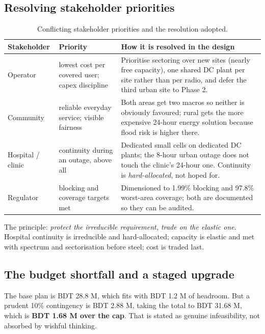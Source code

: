 \documentclass[9pt,a4paper]{article}
\newcommand{\key}[1]{\textbf{#1}}
\begin{document}
\subsection{Resolving stakeholder priorities}
\begin{table}[H]\centering\small
\caption{Conflicting stakeholder priorities and the resolution adopted.}
\begin{tabularx}{\textwidth}{@{}p{2.5cm}p{3.5cm}X@{}}
\toprule
\textbf{Stakeholder} & \textbf{Priority} & \textbf{How it is resolved in the design} \\
\midrule
Operator & lowest cost per covered user; capex discipline & Prioritise sectoring over new sites (nearly free capacity), one shared DC plant per site rather than per radio, and defer the third urban site to Phase 2. \\
Community & reliable everyday service; visible fairness & Both areas get two macros so neither is obviously favoured; rural gets the more expensive 24-hour energy solution because flood risk is higher there. \\
Hospital / clinic & continuity during an outage, above all & Dedicated small cells on dedicated DC plants; the 8-hour urban outage does not touch the clinic's 24-hour one. Continuity is \emph{hard-allocated}, not hoped for. \\
Regulator & blocking and coverage targets met & Dimensioned to 1.99\% blocking and 97.8\% worst-area coverage; both are documented so they can be audited. \\
\bottomrule
\end{tabularx}
\end{table}

The principle: \emph{protect the irreducible requirement, trade on the elastic one}. Hospital
continuity is irreducible and hard-allocated; capacity is elastic and met with spectrum and
sectorisation before steel; cost is traded last.

\subsection{The budget shortfall and a staged upgrade}
The base plan is BDT 28.8 M, which fits with BDT 1.2 M of headroom. But a prudent 10\%
contingency is BDT 2.88 M, taking the total to BDT 31.68 M, which is \key{BDT 1.68 M over the cap}.
That is stated as genuine infeasibility, not absorbed by wishful thinking.
\end{document}
